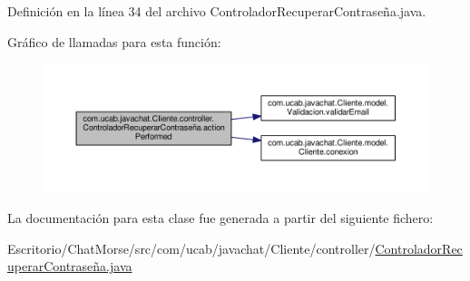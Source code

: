 Definición en la línea 34 del archivo Controlador\-Recuperar\-Contraseña.\-java.



Gráfico de llamadas para esta función\-:\nopagebreak
\begin{figure}[H]
\begin{center}
\leavevmode
\includegraphics[width=350pt]{classcom_1_1ucab_1_1javachat_1_1_cliente_1_1controller_1_1_controlador_recuperar_contrase_xC3_xB1a_a3e2d23c7eea7fa3a47b41cb6638d2335_cgraph}
\end{center}
\end{figure}




La documentación para esta clase fue generada a partir del siguiente fichero\-:\begin{DoxyCompactItemize}
\item 
Escritorio/\-Chat\-Morse/src/com/ucab/javachat/\-Cliente/controller/\hyperlink{_controlador_recuperar_contrase_xC3_xB1a_8java}{Controlador\-Recuperar\-Contraseña.\-java}\end{DoxyCompactItemize}
